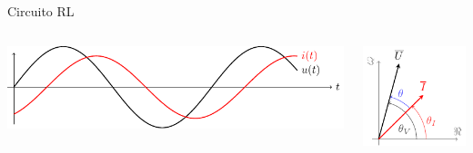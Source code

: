 \documentclass[aspectratio=169, xcolor={usenames,svgnames,dvipsnames}]{beamer}
\begin{document}
\begin{frame}{Circuito RL}
\begin{columns}
\begin{column}{0.7\columnwidth}
\begin{center}
\includegraphics[width=\linewidth]{../figs/inductivo.pdf}
\end{center}
\end{column}
\begin{column}{0.25\columnwidth}
\begin{center}
\includegraphics[width=\linewidth]{../figs/fasorInductanciaReal_VI.pdf}
\end{center}
\end{column}
\end{columns}


\end{frame}
\end{document}

